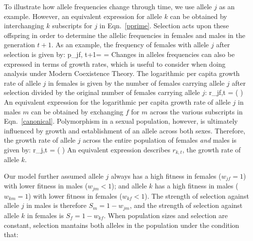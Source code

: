 \documentclass[12pt]{article}
\let\oldequation\equation
\let\oldendequation\endequation
\renewenvironment{equation}
  {\linenomathNonumbers\oldequation}
  {\oldendequation\endlinenomath}
\begin{document}
To illustrate how allele frequencies change through time, we use allele $j$ as an example. However, an equivalent expression for allele $k$ can be obtained by interchanging $k$ subscripts for $j$ in Eqn.~\ref{pprime}. Selection acts upon these offspring in order to determine the allelic frequencies in females and males in the generation $t+1$. As an example, the frequency  of females with allele $j$ after selection is given by:
\begin{equation}
   p_{jf, t+1}=  = 
   \label{next_gen}
\end{equation}
Changes in alleles frequencies can also be expressed in terms of growth rates, which is useful to consider when doing analysis under Modern Coexistence Theory. The logarithmic per capita growth rate of allele $j$ in females is given by the number of females carrying allele $j$ after selection divided by the original number of females carrying allele $j$:
\begin{equation}
    r_{jf,t} = \ln \left(  \right)
    \label{canonical}
\end{equation}
An equivalent expression for the logarithmic per capita growth rate of allele $j$ in males $m$ can be obtained by exchanging $f$ for $m$ across the various subscripts in Eqn.~\ref{canonical}. Polymorphism in a sexual population, however, is ultimately influenced by growth and establishment of an allele across both sexes. Therefore, the growth rate of allele $j$ across the entire population of females \emph{and} males is given by:
\begin{equation}
    r_{j,t} = \ln \left(   \right)
    \label{full}
\end{equation}
An equivalent expression describes $r_{k,t}$, the growth rate of allele $k$.


Our model further assumed allele $j$ always has a high fitness in females ($w_{jf} = 1$) with lower fitness in males ($w_{jm} < 1$); and allele $k$ has a high fitness in males ($w_{km} = 1$)  with lower fitness in females ($w_{kf} < 1 $). The strength of selection against allele $j$ in males is therefore $S_{m}= 1 - w_{jm}$, and the strength of selection against allele $k$ in females is $S_{f}= 1 - w_{kf}$. When population sizes and selection are constant,
selection mantains both alleles in the population under the condition that:
\end{document}
